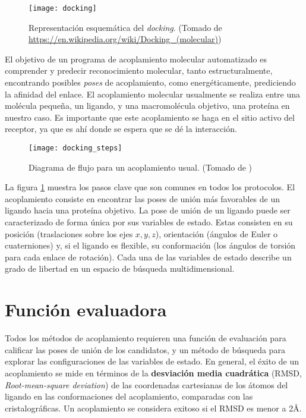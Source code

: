 \begin{figure}[H]
  \texttt{[image: docking]} \centering
  \caption{Representación esquemática del \textit{docking}.  (Tomado de
    \url{https://en.wikipedia.org/wiki/Docking_(molecular)})}
\end{figure}

El objetivo de un programa de acoplamiento molecular automatizado es
comprender y predecir reconocimiento molecular, tanto
estructuralmente, encontrando posibles \textit{poses} de acoplamiento,
como energéticamente, prediciendo la afinidad del enlace. El
acoplamiento molecular usualmente se realiza entre una molécula
pequeña, un ligando, y una macromolécula objetivo, una proteína en
nuestro caso. Es importante que este acoplamiento se haga en el sitio
activo del receptor, ya que es ahí donde se espera que se dé la
interacción.

\begin{figure}[H]
  \texttt{[image: docking\_steps]}
  \caption{Diagrama de flujo para un acoplamiento usual.  (Tomado de
    \cite{kukol})}
  \label{fig:docking_flowchart}
\end{figure}

La figura \ref{fig:docking_flowchart} muestra los pasos clave que son
comunes en todos los protocolos. El acoplamiento consiste en encontrar
las poses de unión más favorables de un ligando hacia una proteína
objetivo. La pose de unión de un ligando puede ser caracterizado de
forma única por sus variables de estado. Estas consisten en su
posición (traslaciones sobre los ejes $x, y, z$), orientación (ángulos
de Euler o cuaterniones) y, si el ligando es flexible, su conformación
(los ángulos de torsión para cada enlace de rotación). Cada una de las
variables de estado describe un grado de libertad en un espacio de
búsqueda multidimensional.

\section{Función evaluadora}
Todos los métodos de acoplamiento requieren una función de evaluación
para calificar las poses de unión de los candidatos, y un método de
búsqueda para explorar las configuraciones de las variables de
estado. En general, el éxito de un acoplamiento se mide en términos de
la \textbf{desviación media cuadrática}
(RMSD, \textit{Root-mean-square deviation}) de las coordenadas
cartesianas de los átomos del ligando en las conformaciones del
acoplamiento, comparadas con las cristalográficas. Un acoplamiento se
considera exitoso si el RMSD es menor a 2\AA.

